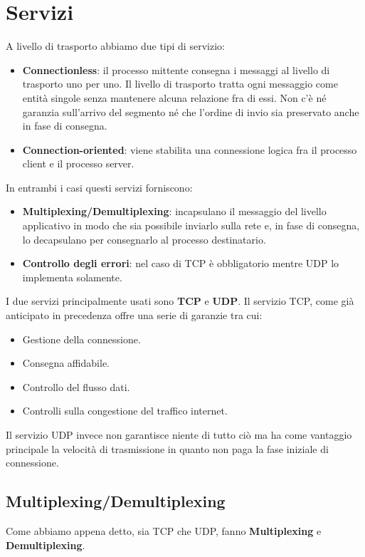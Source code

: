 \section{Servizi}
A livello di trasporto abbiamo due tipi di servizio:
\begin{itemize}
	\item \textbf{Connectionless}: il processo mittente consegna i 
		messaggi al livello di trasporto uno per uno. Il livello di 
		trasporto tratta ogni messaggio come entità singole senza 
		mantenere alcuna relazione fra di essi. Non c'è né garanzia 
		sull'arrivo del segmento né che l'ordine di invio sia 
		preservato anche in fase di consegna.
	\item \textbf{Connection-oriented}: viene stabilita una connessione
		logica fra il processo client e il processo server.
\end{itemize}
In entrambi i casi questi servizi forniscono:
\begin{itemize}
	\item \textbf{Multiplexing/Demultiplexing}: incapsulano il 
		messaggio del livello applicativo in modo che sia possibile 
		inviarlo sulla rete e, in fase di consegna, lo decapsulano per
		consegnarlo al processo destinatario.
	\item \textbf{Controllo degli errori}: nel caso di TCP è 
		obbligatorio mentre UDP lo implementa solamente.
\end{itemize}
I due servizi principalmente usati sono \textbf{TCP} e \textbf{UDP}. Il
servizio TCP, come già anticipato in precedenza offre una serie di 
garanzie tra cui:
\begin{itemize}
	\item Gestione della connessione.
	\item Consegna affidabile.
	\item Controllo del flusso dati.
	\item Controlli sulla congestione del traffico internet.
\end{itemize}
Il servizio UDP invece non garantisce niente di tutto ciò ma ha come
vantaggio principale la velocità di trasmissione in quanto non paga la 
fase iniziale di connessione.

\subsection{Multiplexing/Demultiplexing}
Come abbiamo appena detto, sia TCP che UDP, fanno \textbf{Multiplexing}
e \textbf{Demultiplexing}.

